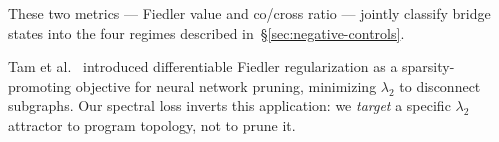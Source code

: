 These two metrics --- Fiedler value and co/cross ratio --- jointly classify
bridge states into the four regimes described in~\S\ref{sec:negative-controls}.

Tam et al.~\cite{tam2020fiedler} introduced differentiable Fiedler
regularization as a sparsity-promoting objective for neural network
pruning, minimizing $\lambda_2$ to disconnect subgraphs. Our spectral
loss inverts this application: we \emph{target} a specific $\lambda_2$
attractor to program topology, not to prune it.

